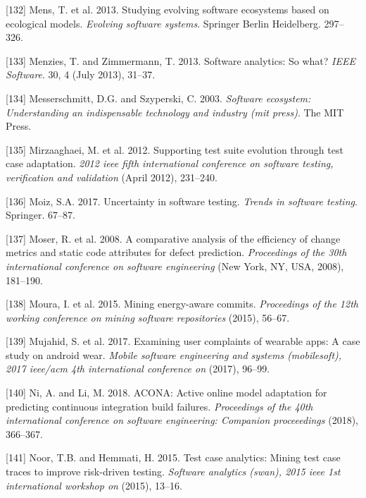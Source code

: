 \documentclass[]{book}
\begin{document}
\hypertarget{ref-Mens2013}{}
{[}132{]} Mens, T. et al. 2013. Studying evolving software ecosystems
based on ecological models. \emph{Evolving software systems}. Springer
Berlin Heidelberg. 297--326.

\hypertarget{ref-Menzi13}{}
{[}133{]} Menzies, T. and Zimmermann, T. 2013. Software analytics: So
what? \emph{IEEE Software}. 30, 4 (July 2013), 31--37.

\hypertarget{ref-Messerschmitt2003}{}
{[}134{]} Messerschmitt, D.G. and Szyperski, C. 2003. \emph{Software
ecosystem: Understanding an indispensable technology and industry (mit
press)}. The MIT Press.

\hypertarget{ref-supportingtestsuite}{}
{[}135{]} Mirzaaghaei, M. et al. 2012. Supporting test suite evolution
through test case adaptation. \emph{2012 ieee fifth international
conference on software testing, verification and validation} (April
2012), 231--240.

\hypertarget{ref-moiz2017uncertainty}{}
{[}136{]} Moiz, S.A. 2017. Uncertainty in software testing. \emph{Trends
in software testing}. Springer. 67--87.

\hypertarget{ref-Moser2008}{}
{[}137{]} Moser, R. et al. 2008. A comparative analysis of the
efficiency of change metrics and static code attributes for defect
prediction. \emph{Proceedings of the 30th international conference on
software engineering} (New York, NY, USA, 2008), 181--190.

\hypertarget{ref-MPEC2015}{}
{[}138{]} Moura, I. et al. 2015. Mining energy-aware commits.
\emph{Proceedings of the 12th working conference on mining software
repositories} (2015), 56--67.

\hypertarget{ref-mujahid2017examining}{}
{[}139{]} Mujahid, S. et al. 2017. Examining user complaints of wearable
apps: A case study on android wear. \emph{Mobile software engineering
and systems (mobilesoft), 2017 ieee/acm 4th international conference on}
(2017), 96--99.

\hypertarget{ref-ni2018acona}{}
{[}140{]} Ni, A. and Li, M. 2018. ACONA: Active online model adaptation
for predicting continuous integration build failures. \emph{Proceedings
of the 40th international conference on software engineering: Companion
proceeedings} (2018), 366--367.

\hypertarget{ref-noor2015test}{}
{[}141{]} Noor, T.B. and Hemmati, H. 2015. Test case analytics: Mining
test case traces to improve risk-driven testing. \emph{Software
analytics (swan), 2015 ieee 1st international workshop on} (2015),
13--16.
\end{document}
